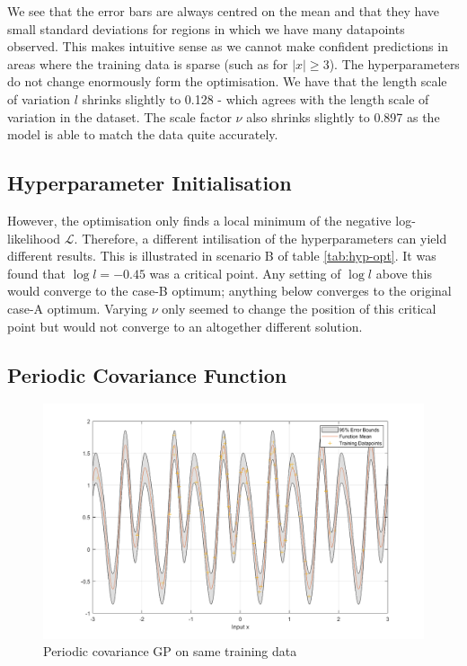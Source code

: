 \documentclass[]{article}
\newcommand{\Lcal}{\mathcal{L}}
\newcommand{\figwidth}{0.6\linewidth}
\begin{document}
We see that the error bars are always centred on the mean and that they have small standard deviations for regions in which we have many datapoints observed. This makes intuitive sense as we cannot make confident predictions in areas where the training data is sparse (such as for $|x| \geq 3$). The hyperparameters do not change enormously form the optimisation. We have that the length scale of variation $l$ shrinks slightly to 0.128 - which agrees with the length scale of variation in the dataset. The scale factor $\nu$ also shrinks slightly to 0.897 as the model is able to match the data quite accurately.

\subsection{Hyperparameter Initialisation}

However, the optimisation only finds a local minimum of the negative log-likelihood $\Lcal$. Therefore, a different intilisation of the hyperparameters can yield different results. This is illustrated in scenario B of table \ref{tab:hyp-opt}. It was found that $\log l = -0.45$ was a critical point. Any setting of $\log l $ above this would converge to the case-B optimum; anything below converges to the original case-A optimum. Varying $\nu$ only seemed to change the position of this critical point but would not converge to an altogether different solution.

 


\subsection{Periodic Covariance Function}

\begin{figure}[!h]
	\centering
	\includegraphics[width=\figwidth]{1c}
	\caption{Periodic covariance GP on same training data}
	\label{fig:1c}
\end{figure}
\end{document}
